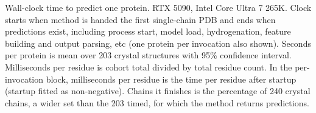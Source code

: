 Wall-clock time to predict one protein. RTX 5090, Intel Core Ultra 7 265K. Clock starts when method is handed the first single-chain PDB and ends when predictions exist, including process start, model load, hydrogenation, feature building and output parsing, etc (one protein per invocation also shown). Seconds per protein is mean over 203 crystal structures with 95\% confidence interval. Milliseconds per residue is cohort total divided by total residue count. In the per-invocation block, milliseconds per residue is the time per residue after startup (startup fitted as non-negative). Chains it finishes is the percentage of 240 crystal chains, a wider set than the 203 timed, for which the method returns predictions.
